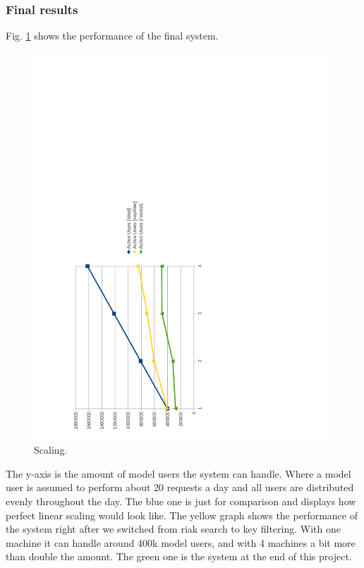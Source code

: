 \documentclass[11pt,a4paper]{report}
\begin{document}
\subsubsection{Final results}
Fig. \ref{fig:load_test:scaling} shows the performance of the final system.
\begin{figure}[htbp!]
  \hspace{.5cm}
 \includegraphics[width=14cm, angle=-90]{./graphics/Load_test-scaling.pdf}
 \vspace{-6cm}
 \caption{Scaling.}
 \label{fig:load_test:scaling}
\end{figure}
The y-axis is the amount of model users the system can handle.
Where a model user is assumed to perform about 20 requests a day and
all users are distributed evenly throughout the day.
The blue one is just for comparison and displays how perfect linear scaling would look like.
The yellow graph shows the performance of the system right after we switched from
riak search to key filtering.
With one machine it can handle around 400k model users, and with 4 machines
a bit more than double the amount.
The green one is the system at the end of this project.
\end{document}
